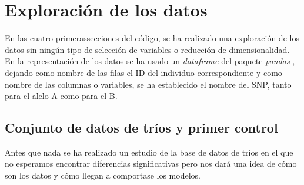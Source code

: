 \section{Exploración de los datos}
En las cuatro primerassecciones del código, se ha realizado una exploración de los datos sin ningún tipo de selección de variables o reducción de dimensionalidad.
En la representación de los datos se ha usado un \textit{dataframe} del paquete \textit{pandas} \cite{mckinney-proc-scipy-2010}, dejando como nombre de las filas el ID del individuo correspondiente y como nombre de las columnas o variables, se ha establecido el nombre del SNP, tanto para el alelo A como para el B.
\subsection{Conjunto de datos de tríos y primer control}
Antes que nada se ha realizado un estudio de la base de datos de tríos en el que no esperamos encontrar diferencias significativas pero nos dará una idea de cómo son los datos y cómo llegan a comportase los modelos.


